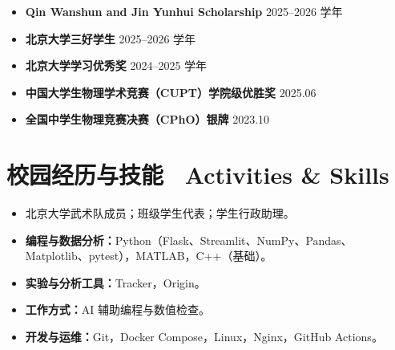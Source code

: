 \documentclass[10pt,a4paper]{article}
\begin{document}
\begin{itemize}
  \item \textbf{Qin Wanshun and Jin Yunhui Scholarship} \hfill 2025--2026 学年
  \item \textbf{北京大学三好学生} \hfill 2025--2026 学年
  \item \textbf{北京大学学习优秀奖} \hfill 2024--2025 学年
  \item \textbf{中国大学生物理学术竞赛（CUPT）学院级优胜奖} \hfill 2025.06
  \item \textbf{全国中学生物理竞赛决赛（CPhO）银牌} \hfill 2023.10
\end{itemize}

\section*{校园经历与技能 \textbar\ Activities \& Skills}

\begin{itemize}
  \item 北京大学武术队成员；班级学生代表；学生行政助理。
  \item \textbf{编程与数据分析：}Python（Flask、Streamlit、NumPy、Pandas、Matplotlib、pytest），MATLAB，C++（基础）。
  \item \textbf{实验与分析工具：}Tracker，Origin。
  \item \textbf{工作方式：}AI 辅助编程与数值检查。
  \item \textbf{开发与运维：}Git，Docker Compose，Linux，Nginx，GitHub Actions。
\end{itemize}
\end{document}
